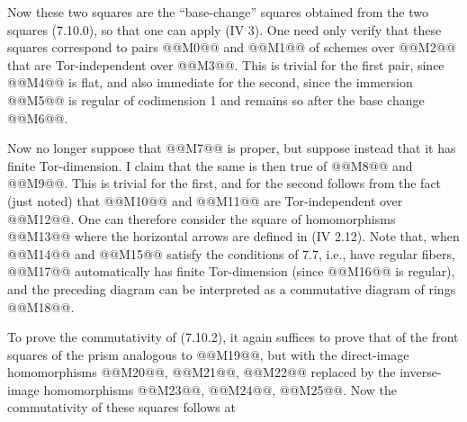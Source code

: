 
Now these two squares are the ``base-change'' squares obtained from the two squares (7.10.0), so that one can apply (IV 3). One need only verify that these squares correspond to pairs @@M0@@ and @@M1@@ of schemes over @@M2@@ that are Tor-independent over @@M3@@. This is trivial for the first pair, since @@M4@@ is flat, and also immediate for the second, since the immersion @@M5@@ is regular of codimension 1 and remains so after the base change @@M6@@.

Now no longer suppose that @@M7@@ is proper, but suppose instead that it has finite Tor-dimension. I claim that the same is then true of @@M8@@ and @@M9@@. This is trivial for the first, and for the second follows from the fact (just noted) that @@M10@@ and @@M11@@ are Tor-independent over @@M12@@. One can therefore consider the square of homomorphisms
@@M13@@
where the horizontal arrows are defined in (IV 2.12). Note that, when @@M14@@ and @@M15@@ satisfy the conditions of 7.7, i.e., have regular fibers, @@M17@@ automatically has finite Tor-dimension (since @@M16@@ is regular), and the preceding diagram can be interpreted as a commutative diagram of rings @@M18@@.

To prove the commutativity of (7.10.2), it again suffices to prove that of the front squares of the prism analogous to @@M19@@, but with the direct-image homomorphisms @@M20@@, @@M21@@, @@M22@@ replaced by the inverse-image homomorphisms @@M23@@, @@M24@@, @@M25@@. Now the commutativity of these squares follows at 